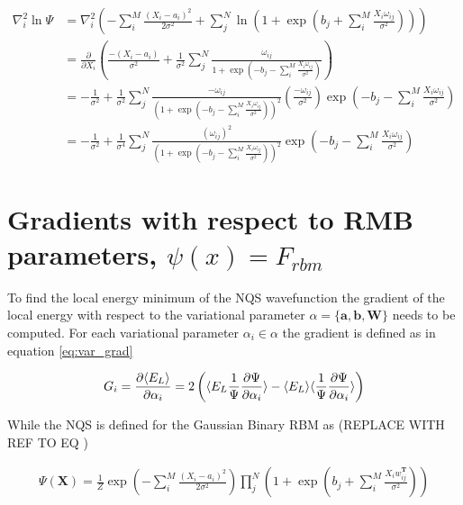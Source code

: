 \begin{align*}
\nabla_i^2 \ln \Psi &= \nabla_i^2 \left( - \sum_{i}^{M} \frac{(X_i - a_i)^2}{2 \sigma^2} +  \sum_{j}^{N} \ln \left( 1 + \exp \left( b_j + \sum_{i}^{M} \frac{X_i \omega_{ij}}{\sigma^2} \right) \right) \right) \\
&= \frac{\partial}{\partial X_i} \left( \frac{-(X_i - a_i)}{\sigma^2} + \frac{1}{\sigma^2} \sum_{j}^{N} \frac{\omega_{ij}}{1 + \exp \left( -b_j - \sum_{i}^{M} \frac{X_i \omega_{ij}}{\sigma^2} \right)} \right) \\
&= -\frac{1}{\sigma^2} + \frac{1}{\sigma^2} \sum_{j}^{N} \frac{-\omega_{ij}}{\left(1 + \exp \left( -b_j - \sum_{i}^{M} \frac{X_i \omega_{ij}}{\sigma^2} \right)\right)^2} \left( \frac{-\omega_{ij}}{\sigma^2} \right) \exp \left( -b_j - \sum_{i}^{M} \frac{X_i \omega_{ij}}{\sigma^2} \right) \\
&= -\frac{1}{\sigma^2} + \frac{1}{\sigma^4} \sum_{j}^{N} \frac{\left(\omega_{ij}\right)^2  }{\left(1 + \exp \left( -b_j - \sum_{i}^{M} \frac{X_i \omega_{ij}}{\sigma^2} \right)\right)^2}\exp \left( -b_j - \sum_{i}^{M} \frac{X_i \omega_{ij}}{\sigma^2} \right) 
\end{align*}

\section{Gradients with respect to RMB parameters, $\psi(x) = F_{rbm}$}

To find the local energy minimum of the NQS wavefunction the  gradient of the local energy with respect to the variational parameter $\alpha  = \{\mathbf{a}, \mathbf{b}, \mathbf{W} \}$ needs to be computed. For each variational parameter $\alpha_i \in \alpha$ the gradient is defined as in equation \ref{eq:var_grad} 

\begin{equation}\label{eq:var_grad}
G_i = \frac{\partial \langle E_L \rangle}{\partial \alpha_i} = 2\left( \langle E_L \frac{1}{\Psi} \frac{\partial \Psi}{\partial \alpha_i} \rangle  - \langle E_L \rangle \langle  \frac{1}{\Psi} \frac{\partial \Psi}{\partial \alpha_i} \rangle\right)    
\end{equation}

\noindent While the NQS is defined for the Gaussian Binary RBM as (REPLACE WITH REF TO EQ )

\begin{align*}
\Psi (\mathbf{X}) = \frac{1}{Z} \exp\left(-\sum_i^M \frac{(X_i - a_i)^2}{2\sigma^2}\right) 
    \prod_j ^N \left( 1 + \exp\left(b_j  + \sum_i^M \frac{X_i w^\mathbf{T}_{ij}}{\sigma^2}\right) \right)
\end{align*}
    
